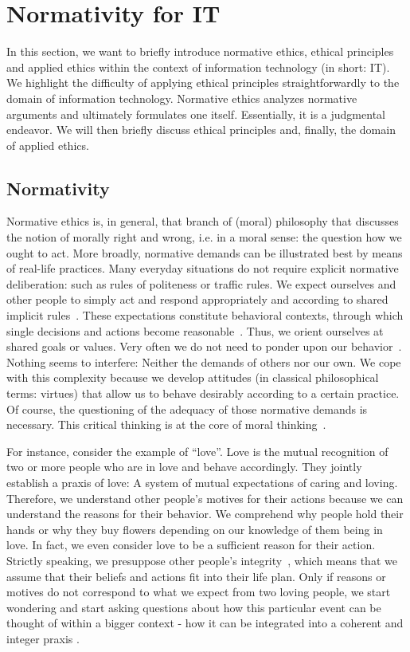 \documentclass[manuscript,screen]{acmart}
\begin{document}
\section{Normativity for IT }
In this section, we want to briefly introduce normative ethics, ethical principles and applied ethics within the context of information technology (in short: IT). We highlight the difficulty of applying ethical principles straightforwardly to the domain of information technology. Normative ethics analyzes normative arguments and ultimately formulates one itself. Essentially, it is a judgmental endeavor. We will then briefly discuss ethical principles and, finally, the domain of applied ethics.

\subsection{Normativity}
Normative ethics is, in general, that branch of (moral) philosophy that discusses the notion of morally right and wrong, i.e. in a moral sense: the question how we ought to act. More broadly, normative demands can be illustrated best by means of real-life practices. Many everyday situations do not require explicit normative deliberation: such as rules of politeness or traffic rules. We expect ourselves and other people to simply act and respond appropriately and according to shared implicit rules~\cite{strawson2008freedom,nida2019structural}. These expectations constitute behavioral contexts, through which single decisions and actions become reasonable~\cite{macintyre2013after,nida2019structural}. Thus, we orient ourselves at shared goals or values. Very often we do not need to ponder upon our behavior~\cite{mead1923scientific,mead1934mind}. Nothing seems to interfere: Neither the demands of others nor our own. We cope with this complexity because we develop attitudes (in classical philosophical terms: virtues) that allow us to behave desirably according to a certain practice. Of course, the questioning of the adequacy of those normative demands is necessary. This critical thinking is at the core of moral thinking~\cite{mead1934mind}. 

For instance, consider the example of “love”. Love is the mutual recognition of two or more people who are in love and behave accordingly. They jointly establish a praxis of love: A system of mutual expectations of caring and loving. Therefore, we understand other people's motives for their actions because we can understand the reasons for their behavior. We comprehend why people hold their hands or why they buy flowers depending on our knowledge of them being in love. In fact, we even consider love to be a sufficient reason for their action. Strictly speaking, we presuppose other people’s integrity~\cite[p.83]{nida2018digitaler}, which means that we assume that their beliefs and actions fit into their life plan. Only if reasons or motives do not correspond to what we expect from two loving people, we start wondering and start asking questions about how this particular event can be thought of within a bigger context - how it  can be integrated into a coherent and integer praxis \citep{knauff2021handbook}.
\end{document}
